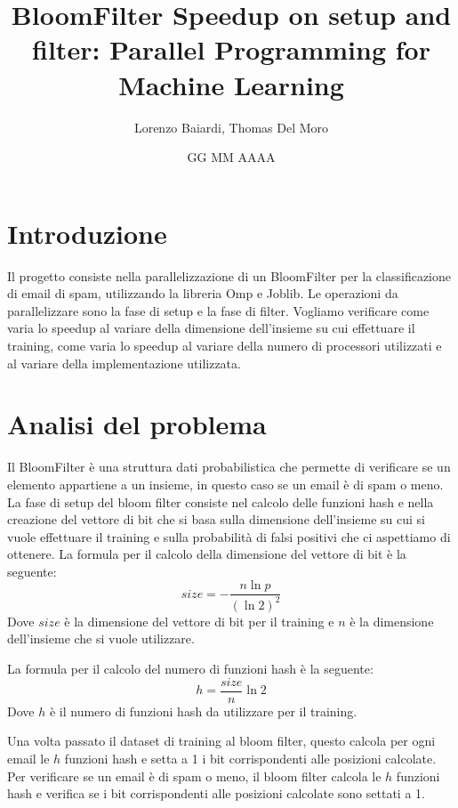 \documentclass[11pt]{article}
\title{BloomFilter Speedup on setup and filter: Parallel Programming for Machine Learning}
\author{Lorenzo Baiardi, Thomas Del Moro}
\date{GG MM AAAA}
\begin{document}
    \maketitle
    \clearpage

    \section{Introduzione}\label{sec:introduzione}
    Il progetto consiste nella parallelizzazione di un BloomFilter per la classificazione di email di spam, utilizzando
    la libreria Omp e Joblib.
    Le operazioni da parallelizzare sono la fase di setup e la fase di filter.
    Vogliamo verificare come varia lo speedup al variare della dimensione dell'insieme su cui effettuare il training,
    come varia lo speedup al variare della numero di processori utilizzati e al variare della implementazione utilizzata.

    \section{Analisi del problema}\label{sec:analisi-del-problema}
    Il BloomFilter è una struttura dati probabilistica che permette di verificare se un elemento appartiene a un insieme,
    in questo caso se un email è di spam o meno.
    La fase di setup del bloom filter consiste nel calcolo delle funzioni hash e nella creazione del vettore di bit che
    si basa sulla dimensione dell'insieme su cui si vuole effettuare il training e sulla probabilità di falsi positivi
    che ci aspettiamo di ottenere.
    La formula per il calcolo della dimensione del vettore di bit è la seguente:
    \begin{equation}
        size = -\frac{n \ln{p}}{(\ln{2})^2}\label{eq:dim_bit}
    \end{equation}
    Dove $size$ è la dimensione del vettore di bit per il training e $n$ è la dimensione dell'insieme che si vuole utilizzare.

    La formula per il calcolo del numero di funzioni hash è la seguente:
    \begin{equation}
        h = \frac{size}{n} \ln{2}\label{eq:num_hash}
    \end{equation}
    Dove $h$ è il numero di funzioni hash da utilizzare per il training.

    Una volta passato il dataset di training al bloom filter, questo calcola per ogni email le $h$ funzioni hash e setta
    a 1 i bit corrispondenti alle posizioni calcolate.
    Per verificare se un email è di spam o meno, il bloom filter calcola le $h$ funzioni hash e verifica se i bit
    corrispondenti alle posizioni calcolate sono settati a 1.
\end{document}
